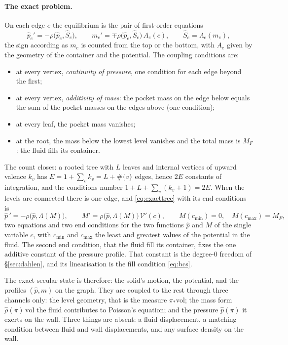 \documentclass[11pt]{article}
\theoremstyle{definition}
\theoremstyle{remark}
\newcommand{\Vol}{\mathcal V}
\newcommand{\vol}{\mathrm{vol}}
\begin{document}
\paragraph{The exact problem.} On each edge $e$ the equilibrium is the
pair of first-order equations
\begin{equation}
  \hat p_e' = -\rho\bigl(\hat p_e, \hat S_e\bigr),\qquad
  m_e' = \mp\rho\bigl(\hat p_e, \hat S_e\bigr)\,A_e(c),\qquad
  \hat S_e = \Lambda_e(m_e),
  \label{eq:exacttree}
\end{equation}
the sign according as $m_e$ is counted from the top or the bottom,
with $A_e$ given by the geometry of the container and the potential.
The coupling conditions are:
\begin{itemize}
\item at every vertex, \emph{continuity of pressure}, one condition for
  each edge beyond the first;
\item at every vertex, \emph{additivity of mass}: the pocket mass on
  the edge below equals the sum of the pocket masses on the edges above
  (one condition);
\item at every leaf, the pocket mass vanishes;
\item at the root, the mass below the lowest level vanishes and the
  total mass is $M_F$: the fluid fills its container.
\end{itemize}
The count closes: a rooted tree with $L$ leaves and internal vertices
of upward valence $k_v$ has $E = 1 + \sum_vk_v = L + \#\{v\}$ edges,
hence $2E$ constants of integration, and the conditions number $1 + L
+ \sum_v(k_v + 1) = 2E$. When the levels are connected there is one
edge, and \eqref{eq:exacttree} with its end conditions is
\begin{equation}
  \hat p\,' = -\rho\bigl(\hat p, \Lambda(M)\bigr),\qquad
  M' = \rho\bigl(\hat p, \Lambda(M)\bigr)\,\Vol'(c),\qquad
  M(c_{\min}) = 0,\quad M(c_{\max}) = M_F ,
  \label{eq:exact}
\end{equation}
two equations and two end conditions for the two functions $\hat p$
and $M$ of the single variable $c$, with $c_{\min}$ and $c_{\max}$ the
least and greatest values of the potential in the fluid. The second
end condition, that the fluid fill its container, fixes the one
additive constant of the pressure profile. That constant is the
degree-0 freedom of \S\ref{sec:dahlen}, and its linearisation is the
fill condition \eqref{eq:bcs}.

The exact secular state is therefore: the solid's motion, the
potential, and the profiles $(\hat p, m)$ on the graph. They are
coupled to the rest through three channels only: the level geometry,
that is the measure $\pi_*\vol$; the mass form $\hat\rho(\pi)\,\vol$
the fluid contributes to Poisson's equation; and the pressure
$\hat p(\pi)$ it exerts on the wall. Three things are absent: a fluid
displacement, a matching condition between fluid and wall
displacements, and any surface density on the wall.
\end{document}
